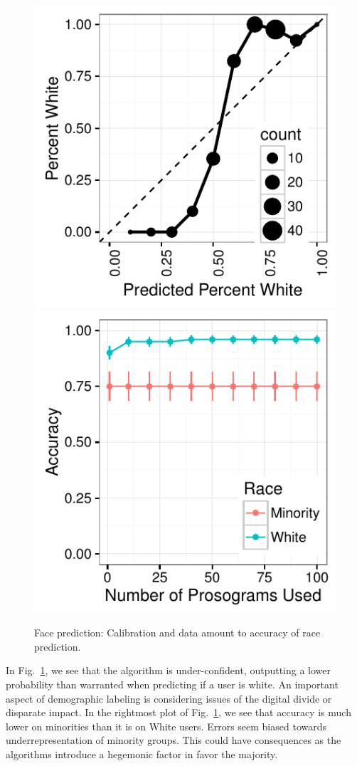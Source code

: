 \begin{figure}
  \centering
    \includegraphics[width=0.48\linewidth]{fig/census/calibration_race_face-eps-converted-to.pdf}
    \includegraphics[width=0.48\linewidth]{fig/census/faces_v_accuracy_race_labeled-eps-converted-to.pdf}
  \caption{Face prediction: Calibration and data amount to accuracy of race prediction.\label{fig:accuracy_race_face}}
\end{figure}

In Fig.~\ref{fig:accuracy_race_face}, we see that the algorithm is under-confident, outputting a lower probability than warranted when predicting if a user is white.
An important aspect of demographic labeling is considering issues of the digital divide or disparate impact.
In the rightmost plot of Fig.~\ref{fig:accuracy_race_face}, we see that accuracy is much lower on minorities than it is on White users.
Errors seem biased towards underrepresentation of minority groups.
This could have consequences as the algorithms introduce a hegemonic factor in favor the majority.

